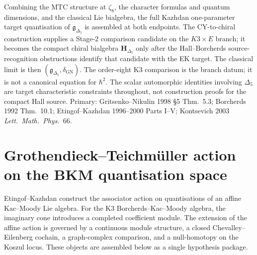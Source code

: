 \begin{remark}
\label{rem:qgf-kazhdan-synthesis}
Combining the MTC structure at $\zeta_8$, the character formulas
and quantum dimensions, and the classical Lie bialgebra, the full
Kazhdan one-parameter target quantisation of
$\mathfrak g_{\Delta_5}$ is assembled at both endpoints. The
CY-to-chiral construction supplies a Stage-$2$ comparison candidate on
the $K3\times E$ branch; it becomes the compact chiral bialgebra
$\mathbf H_{\Delta_5}$ only after the Hall--Borcherds source-recognition
obstructions identify that candidate with the EK target. The classical limit is
then $(\mathfrak g_{\Delta_5}, \delta_{\mathrm{GN}})$. The
order-eight K3 comparison is the branch datum; it is not a canonical
equation for \(\hbar^2\). The
scalar automorphic identities involving $\Delta_5$ are target
characteristic constraints throughout, not construction proofs for the compact
Hall source. Primary: Gritsenko--Nikulin 1998 \S5 Thm.~5.3; Borcherds
1992 Thm.~10.1; Etingof--Kazhdan 1996--2000 Parts I--V; Kontsevich 2003
\emph{Lett.\ Math.\ Phys.}~66.
\end{remark}

\section{Grothendieck--Teichm\"uller action on the BKM quantisation
space}
\label{sec:qgf-grt1-bkm}

\providecommand{\grt}{\mathfrak{grt}}
\providecommand{\Quant}{\mathrm{Quant}}
\providecommand{\Imag}{\mathrm{Imag}}
\providecommand{\Ass}{\mathrm{Ass}}

Etingof--Kazhdan construct the associator action on quantisations of
an affine Kac--Moody Lie algebra.  For the K$3$ Borcherds--Kac--Moody
algebra, the imaginary cone introduces a completed coefficient module.
The extension of the affine action is governed by a continuous module
structure, a closed Chevalley--Eilenberg cochain, a graph-complex
comparison, and a null-homotopy on the Koszul locus.  These objects are
assembled below as a single hypothesis package.

